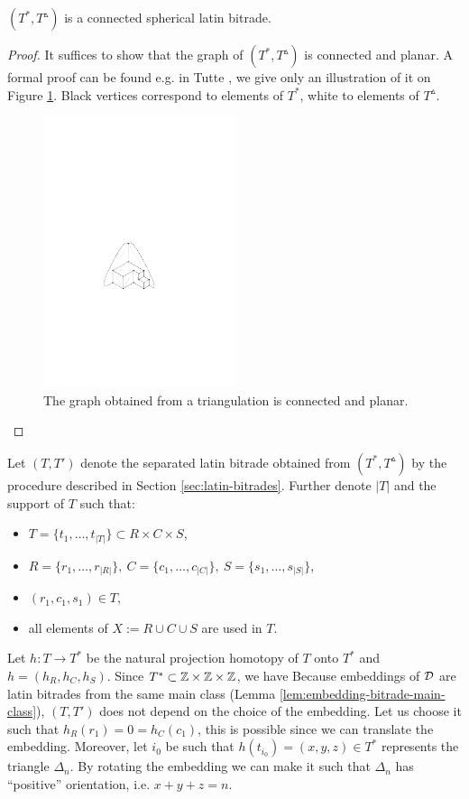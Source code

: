 \begin{lem}
$(T^*, T^\vartriangle)$ is a connected spherical latin bitrade.
\end{lem}
\begin{proof}
It suffices to show that the graph of $(T^*, T^\vartriangle)$ is connected and planar. A formal proof can be found e.g. in Tutte \cite{Tutte48}, we give only an illustration of it on Figure \ref{fig:triangulation-graph}. Black vertices correspond to elements of $T^*$, white to elements of $T^\vartriangle$.

\begin{figure}[htb]
\centering
\includegraphics[width=0.5\textwidth]{img/triangulation_graph.pdf}
\caption{The graph obtained from a triangulation is connected and planar.}
\label{fig:triangulation-graph}
\end{figure}
\end{proof}

Let $(T,T')$ denote the separated latin bitrade obtained from $(T^*, T^\vartriangle)$ by the procedure described in Section \ref{sec:latin-bitrades}. Further denote $|T|$ and the support of $T$ such that:
\begin{itemize}
	\item $T = \{t_1, \dots, t_{|T|}\} \subset R \times C \times S$,
	\item $R = \{r_1,\dots,r_{|R|}\},\ 
		C = \{c_1,\dots,c_{|C|}\},\ 
		S = \{s_1,\dots,s_{|S|}\}$,
	\item $(r_1,c_1,s_1) \in T$,
	\item all elements of $X := R \cup C \cup S$ are used in $T$.
\end{itemize}%
Let $h:T \rightarrow T^*$ be the natural projection homotopy of $T$ onto $T^*$ and $h = (h_R, h_C, h_S)$. Since $T^* \subset \mathbb Z \times \mathbb Z \times \mathbb Z$, we have
\cosyalign{
	h_R: R \rightarrow \Z,\ h_C: C \rightarrow \Z,\ h_S: S \rightarrow \Z.
}%
Because embeddings of $\mathcal D$ are latin bitrades from the same main class (Lemma \ref{lem:embedding-bitrade-main-class}), $(T,T')$ does not depend on the choice of the embedding. Let us choose it such that $h_R(r_1) = 0 = h_C(c_1)$, this is possible since we can translate the embedding. Moreover, let $i_0$ be such that $h(t_{i_0}) = (x,y,z) \in T^*$ represents the triangle $\Delta_n$. By rotating the embedding we can make it such that $\Delta_n$ has ``positive'' orientation, i.e. $x+y+z = n$.

